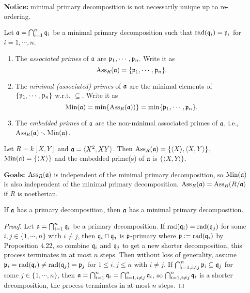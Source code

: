 \noindent \textbf{Notice:} minimal primary decomposition is not necessarily unique up to re-ordering.

\begin{definition}
    Let $\mathfrak{a} = \bigcap_{i=1}^{n} \mathfrak{q}_i$ be a minimal primary decomposition such that $\operatorname{rad}(\mathfrak{q}_i) = \mathfrak{p}_i$ for $i = 1,\cdots,n$.
    \begin{enumerate}
        \item The \emph{associated primes} of $\mathfrak{a}$ are $\mathfrak{p}_1,\cdots,\mathfrak{p}_n$. Write it as 
            \[\operatorname{Ass}_R(\mathfrak{a}) = \{\mathfrak{p}_1,\cdots,\mathfrak{p}_n\}.\]
        \item The \emph{minimal (associated) primes} of $\mathfrak{a}$ are the minimal elements of $\{\mathfrak{p}_1,\cdots,\mathfrak{p}_n\}$ w.r.t. $\subseteq$. Write it as 
            \[\operatorname{Min}(\mathfrak{a}) = \min\{\operatorname{Ass}_R(\mathfrak{a}))\} = \min\{\mathfrak{p}_1,\cdots,\mathfrak{p}_n\}.\]
    \item The \emph{embedded primes} of $\mathfrak{a}$ are the non-minimal associated primes of $\mathfrak{a}$, i.e., $\operatorname{Ass}_R(\mathfrak{a}) \smallsetminus \operatorname{Min}(\mathfrak{a})$.
    \end{enumerate}
\end{definition}

\begin{example}
    Let $R = k[X,Y]$ and $\mathfrak{a} = \langle X^{2},XY \rangle$. Then $\operatorname{Ass}_R(\mathfrak{a}) = \{\langle X \rangle, \langle X,Y \rangle\}$, $\operatorname{Min}(\mathfrak{a}) = \{\langle X \rangle\}$ and the embedded prime(s) of $\mathfrak{a}$ is $\{\langle X,Y \rangle\}$.
\end{example}

\noindent \textbf{Goals:} $\operatorname{Ass}_R(\mathfrak{a})$ is independent of the minimal primary decomposition, so $\operatorname{Min}(\mathfrak{a})$ is also independent of the minimal primary decomposition. $\operatorname{Ass}_R(\mathfrak{a}) = \operatorname{Ass}_R(R/\mathfrak{a})$ if $R$ is noetherian.

\begin{proposition}
    If $\mathfrak{a}$ has a primary decomposition, then $\mathfrak{a}$ has a minimal primary decomposition.
\end{proposition}

\begin{proof}
    Let $\mathfrak{a} = \bigcap_{i=1}^{n} \mathfrak{q}_i$ be a primary decomposition. If $\operatorname{rad}(\mathfrak{q}_i) = \operatorname{rad}(\mathfrak{q}_j)$ for some $i,j \in \{1,\cdots,n\}$ with $i \neq j$, then $\mathfrak{q}_i \cap \mathfrak{q}_j$ is $\mathfrak{p}$-primary where $\mathfrak{p} := \operatorname{rad}(\mathfrak{q}_i)$ by Proposition 4.22, so combine $\mathfrak{q}_i$ and $\mathfrak{q}_j$ to get a new shorter decomposition, this process terminates in at most $n$ steps. Then without loss of generality, assume $\mathfrak{p}_i = \operatorname{rad}(\mathfrak{q}_i) \neq \operatorname{rad}(\mathfrak{q}_j) = \mathfrak{p}_j$ for $1 \leq i,j \leq n$ with $i \neq j$. If $\bigcap_{i=1,i\neq j}^{n} \mathfrak{p}_i \subseteq \mathfrak{q}_j$ for some $j \in \{1,\cdots,n\}$, then $\mathfrak{a} = \bigcap_{i=1}^{n} \mathfrak{q}_i = \bigcap_{i=1,i \neq j}^{n} \mathfrak{q}_i$, so $\bigcap_{i=1,i \neq j}^{n} \mathfrak{q}_i$ is a shorter decomposition, the process terminates in at most $n$ steps.
\end{proof}

